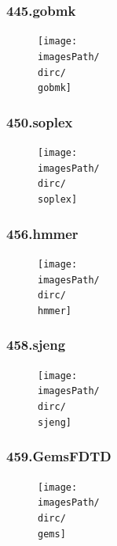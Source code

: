 \documentclass[12pt,a4paper]{article}
\newcommand{\imagesPath}{/home/nick/arch-ntua/ex02/graphs}
\newcommand{\gobmk}{445.gobmk.cslab_branch_predictors.out.pdf}
\newcommand{\soplex}{450.soplex.cslab_branch_predictors.out.pdf}
\newcommand{\hmmer}{456.hmmer.cslab_branch_predictors.out.pdf}
\newcommand{\sjeng}{458.sjeng.cslab_branch_predictors.out.pdf}
\newcommand{\gems}{459.GemsFDTD.cslab_branch_predictors.out.pdf}
\newcommand{\dirc}{4.3}
\begin{document}
			\subsubsection{445.gobmk}
				\begin{figure}[H]
					\begin{center}
						 \texttt{[image: \\imagesPath/\\dirc/\\gobmk]}
					\end{center}
				\end{figure}
			
			\subsubsection{450.soplex}
				\begin{figure}[H]
					\begin{center}
						 \texttt{[image: \\imagesPath/\\dirc/\\soplex]}
					\end{center}
				\end{figure}
			
			\subsubsection{456.hmmer}
				\begin{figure}[H]
					\begin{center}
						 \texttt{[image: \\imagesPath/\\dirc/\\hmmer]}
					\end{center}
				\end{figure}
			
			\subsubsection{458.sjeng}
				\begin{figure}[H]
					\begin{center}
						 \texttt{[image: \\imagesPath/\\dirc/\\sjeng]}
					\end{center}
				\end{figure}
			
			\subsubsection{459.GemsFDTD}
				\begin{figure}[H]
					\begin{center}
						 \texttt{[image: \\imagesPath/\\dirc/\\gems]}
					\end{center}
				\end{figure}
			
\end{document}
